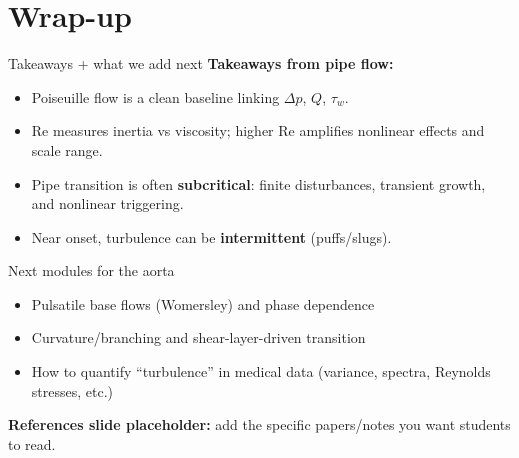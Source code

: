 \documentclass[aspectratio=169]{beamer}
\newcommand{\Rey}{\mathrm{Re}}
\begin{document}
\section{Wrap-up}

\begin{frame}{Takeaways + what we add next}
\textbf{Takeaways from pipe flow:}
\begin{itemize}
  \item Poiseuille flow is a clean baseline linking $\Delta p$, $Q$, $\tau_w$.
  \item $\Rey$ measures inertia vs viscosity; higher $\Rey$ amplifies nonlinear effects and scale range.
  \item Pipe transition is often \textbf{subcritical}: finite disturbances, transient growth, and nonlinear triggering.
  \item Near onset, turbulence can be \textbf{intermittent} (puffs/slugs).
\end{itemize}

\begin{block}{Next modules for the aorta}
\begin{itemize}
  \item Pulsatile base flows (Womersley) and phase dependence
  \item Curvature/branching and shear-layer-driven transition
  \item How to quantify ``turbulence'' in medical data (variance, spectra, Reynolds stresses, etc.)
\end{itemize}
\end{block}

\vspace{0.6em}
\textbf{References slide placeholder:} add the specific papers/notes you want students to read.
\end{frame}
\end{document}
